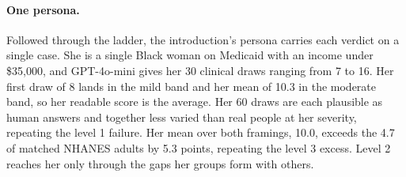 \paragraph{One persona.}
Followed through the ladder, the introduction's persona carries each verdict on a single case.
She is a single Black woman on Medicaid with an income under \$35,000, and GPT-4o-mini gives her 30 clinical draws ranging from 7 to 16. %
Her first draw of 8 lands in the mild band and her mean of 10.3 in the moderate band, so her readable score is the average. %
Her 60 draws are each plausible as human answers and together less varied than real people at her severity, repeating the level 1 failure. %
Her mean over both framings, 10.0, exceeds the 4.7 of matched NHANES adults by 5.3 points, repeating the level 3 excess. %
Level 2 reaches her only through the gaps her groups form with others.

